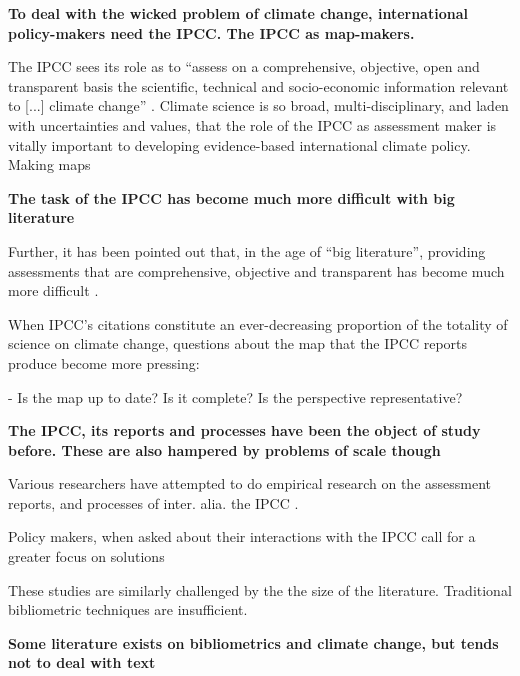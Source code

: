 \documentclass{article}
\begin{document}
\bigskip


\bigskip
\noindent\textbf{To deal with the wicked problem of climate change, international policy-makers need the IPCC. The IPCC as map-makers.}

The IPCC sees its role as to ``assess on a comprehensive, objective, open and transparent basis the scientific, technical and socio-economic information relevant to [...] climate change'' \citep{IPCC2013}. Climate science is so broad, multi-disciplinary, and laden with uncertainties and values, that the role of the IPCC as assessment maker is vitally important to developing evidence-based international climate policy.
Making maps \citep{Edenhofer2015}



\bigskip
\noindent\textbf{The task of the IPCC has become much more difficult with big literature}

Further, it has been pointed out that, in the age of ``big literature'', providing assessments that are comprehensive, objective and transparent has become much more difficult \citep{Minx2017l}. 


When IPCC's citations constitute an ever-decreasing proportion of the totality of science on climate change, questions about the map that the IPCC reports produce become more pressing:

- Is the map up to date? Is it complete? Is the perspective representative? 




\bigskip
\noindent\textbf{The IPCC, its reports and processes have been the object of study before. These are also hampered by problems of scale though}

Various researchers have attempted to do empirical research on the assessment reports, and processes of inter. alia. the IPCC \citep{jabbour2017} \citep{Bjurström2011} \citep{Corbera2016} \citep{Hulme2016}. 

Policy makers, when asked about their interactions with the IPCC call for a greater focus on solutions \citep{Kowarsch2017}

These studies are similarly challenged by the the size of the literature. Traditional bibliometric techniques are insufficient.

\bigskip
\noindent\textbf{Some literature exists on bibliometrics and climate change, but tends not to deal with text}
\end{document}
